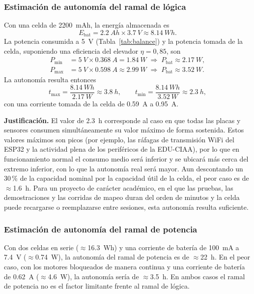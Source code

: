 \subsubsection{Estimación de autonomía del ramal de lógica}
Con una celda de \SI{2200}{mAh}, la energía almacenada es
\begin{equation*}
E_{\text{bat}} = \SI{2,2}{Ah} \times \SI{3,7}{V} \approx \SI{8,14}{Wh}.
\end{equation*}
La potencia consumida a \SI{5}{V} (Tabla~\ref{tab:balance}) y la potencia tomada de la celda, suponiendo una eficiencia del elevador $\eta = 0{,}85$, son
\begin{align*}
P_{\min} &= \SI{5}{V} \times \SI{0,368}{A} = \SI{1,84}{W} \;\Rightarrow\; P_{\text{bat}} \approx \SI{2,17}{W},\\
P_{\max} &= \SI{5}{V} \times \SI{0,598}{A} \approx \SI{2,99}{W} \;\Rightarrow\; P_{\text{bat}} \approx \SI{3,52}{W}.
\end{align*}
La autonomía resulta entonces
\begin{equation*}
t_{\max} = \frac{\SI{8,14}{Wh}}{\SI{2,17}{W}} \approx \SI{3,8}{h}, \qquad
t_{\min} = \frac{\SI{8,14}{Wh}}{\SI{3,52}{W}} \approx \SI{2,3}{h},
\end{equation*}
con una corriente tomada de la celda de \SI{0,59}{A} a \SI{0,95}{A}.

\textbf{Justificación.} El valor de \SI{2,3}{h} corresponde al caso en que todas las placas y sensores consumen simultáneamente su valor máximo de forma sostenida. Estos valores máximos son picos (por ejemplo, las ráfagas de transmisión WiFi del ESP32 y la actividad plena de los periféricos de la EDU-CIAA), por lo que en funcionamiento normal el consumo medio será inferior y se ubicará más cerca del extremo inferior, con lo que la autonomía real será mayor. Aun descontando un 30\,\% de la capacidad nominal por la capacidad útil de la celda, el peor caso es de $\approx$\SI{1,6}{h}. Para un proyecto de carácter académico, en el que las pruebas, las demostraciones y las corridas de mapeo duran del orden de minutos y la celda puede recargarse o reemplazarse entre sesiones, esta autonomía resulta suficiente.

\subsubsection{Estimación de autonomía del ramal de potencia}
Con dos celdas en serie ($\approx$\SI{16,3}{Wh}) y una corriente de batería de \SI{100}{mA} a \SI{7,4}{V} ($\approx$\SI{0,74}{W}), la autonomía del ramal de potencia es de $\approx$\SI{22}{h}. En el peor caso, con los motores bloqueados de manera continua y una corriente de batería de \SI{0,62}{A} ($\approx$\SI{4,6}{W}), la autonomía sería de $\approx$\SI{3,5}{h}. En ambos casos el ramal de potencia no es el factor limitante frente al ramal de lógica.

